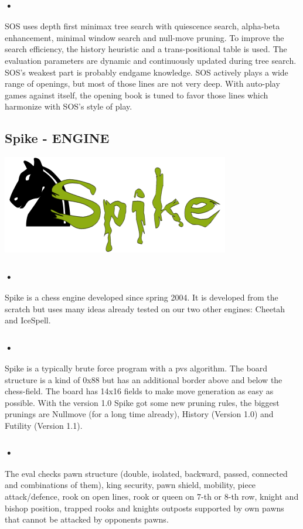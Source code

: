\documentclass{svproc}
\begin{document}
\subsubsection{•}
SOS uses depth first minimax tree search with quiescence search, alpha-beta enhancement, minimal window search and null-move pruning. To improve the search efficiency, the history heuristic and a trans-positional table is used. The evaluation parameters are dynamic and continuously updated during tree search. SOS's weakest part is probably endgame knowledge. SOS actively plays a wide range of openings, but most of those lines are not very deep. With auto-play games against itself, the opening book is tuned to favor those lines which harmonize with SOS's style of play. 


\subsection{Spike - ENGINE}

\begin{center}
  \includegraphics[scale=1]{spike}
\end{center}

\subsubsection{•}
Spike is a chess engine developed since spring 2004. It is developed  
from the scratch but uses many ideas already tested on our two other 
engines: Cheetah and IceSpell.

\subsubsection{•}
Spike is a typically brute force program with a pvs algorithm. The board structure is a kind of 0x88 but has an additional border above and below the chess-field. The board has 14x16 fields to make move generation as easy as possible. With the version 1.0 Spike got some new pruning rules, 
the biggest prunings are Nullmove (for a long time already), History 
(Version 1.0) and Futility (Version 1.1).

\subsubsection{•}
The eval checks pawn structure (double, isolated, backward, passed, 
connected and combinations of them), king security, pawn shield, 
mobility, piece attack/defence, rook on open lines, rook or queen on 
7-th or 8-th row, knight and bishop position, trapped rooks and knights 
outposts supported by own pawns that cannot be attacked by opponents 
pawns.
\end{document}
